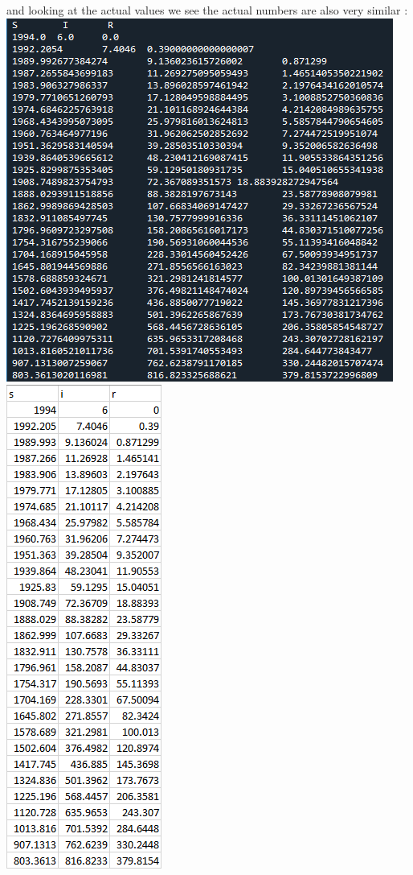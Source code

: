 \documentclass[12pt,letterpaper]{article}
\begin{document}
\begin{enumerate}
\begin{enumerate}
  and looking at the actual values we see the actual numbers are also very similar : \\
  \includegraphics[scale = .9]{number4pygraph.png}
  \includegraphics[scale = .68]{number4excelgraph.png}


\end{enumerate}
\end{enumerate}
\end{document}
